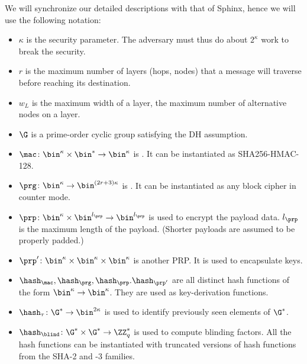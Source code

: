 We will synchronize our detailed descriptions with that of 
\ac{Sphinx}, hence we will use the following notation:
\begin{itemize}
  \item \(\kappa\) is the security parameter.
    The adversary must thus do about \(2^\kappa\) work to break the security.

  \item \(r\) is the maximum number of layers (hops, nodes) that a message will 
    traverse before reaching its destination.
  \item \(w_L\) is the maximum width of a layer, \ie the maximum 
    number of alternative nodes on a layer.

  \item \(\G\) is a prime-order cyclic group satisfying the \ac{DH} assumption.

  \item \(\mac\colon \bin^\kappa\times \bin^*\to \bin^\kappa\) is .
    It can be instantiated as \eg SHA256-HMAC-128.

  \item \(\prg\colon \bin^\kappa\to \bin^{(2r+3)\kappa}\) is .
    It can be instantiated as any block cipher in counter mode.

  \item \(\prp\colon \bin^\kappa\times \bin^{l_\prp} \to \bin^{l_\prp}\) is 
     used to encrypt the payload data.
    \(l_\prp\) is the maximum length of the payload.
    (Shorter payloads are assumed to be properly padded.)

  \item \(\prp'\colon \bin^\kappa\times \bin^\kappa\times \bin^\kappa\) is 
    another \ac{PRP}.
    It is used to encapsulate keys.

  \item \(\hash_\mac, \hash_\prg, \hash_\prp. \hash_{\prp'}\) are all distinct 
    hash functions of the form \(\bin^\kappa\to \bin^\kappa\).
    They are used as key-derivation functions.

  \item \(\hash_\tau\colon \G^*\to \bin^{2\kappa}\) is used to identify 
    previously seen elements of \(\G^*\).

  \item \(\hash_\blind\colon \G^*\times \G^*\to \ZZ_q^*\) is used to compute 
    blinding factors.
    All the hash functions can be instantiated with truncated versions of hash 
    functions from the SHA-2 and -3 families.


\end{itemize}
